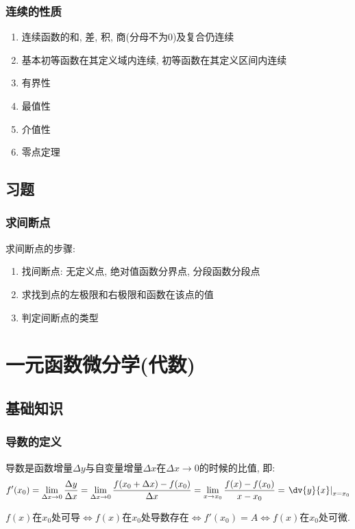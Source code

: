 \subsection{连续的性质}
\begin{enumerate}
    \item 连续函数的和, 差, 积, 商(分母不为0)及复合仍连续
    \item 基本初等函数在其定义域内连续, 初等函数在其定义区间内连续
    \item 有界性
    \item 最值性
    \item 介值性
    \item 零点定理
\end{enumerate}
\section{习题}
\subsection{求间断点}
求间断点的步骤:
\begin{enumerate}
    \item 找间断点: 无定义点, 绝对值函数分界点, 分段函数分段点
    \item 求找到点的左极限和右极限和函数在该点的值
    \item 判定间断点的类型
\end{enumerate}
\chapter{一元函数微分学(代数)}
\section{基础知识}
\subsection{导数的定义}
导数是函数增量$ \Delta y $与自变量增量$ \Delta x $在$ \Delta x \rightarrow 0 $的时候的比值, 即:
\begin{equation*}
    f'(x_{0})=\lim\limits_{\Delta x\rightarrow 0}\frac{\Delta y}{\Delta x}=\lim\limits_{\Delta x\rightarrow 0}\frac{f(x_{0}+\Delta x)-f(x_{0})}{\Delta x}=\lim\limits_{x\rightarrow x_{0}}\frac{f(x)-f(x_{0})}{x-x_{0}}=\left.\dv{y}{x}\right|_{x=x_{0}}
\end{equation*}\par
$ f(x) $在$ x_{0} $处可导$ \Leftrightarrow f(x)$在$ x_{0} $处导数存在$ \Leftrightarrow f'(x_{0})=A \Leftrightarrow f(x) $在$ x_{0} $处可微.
